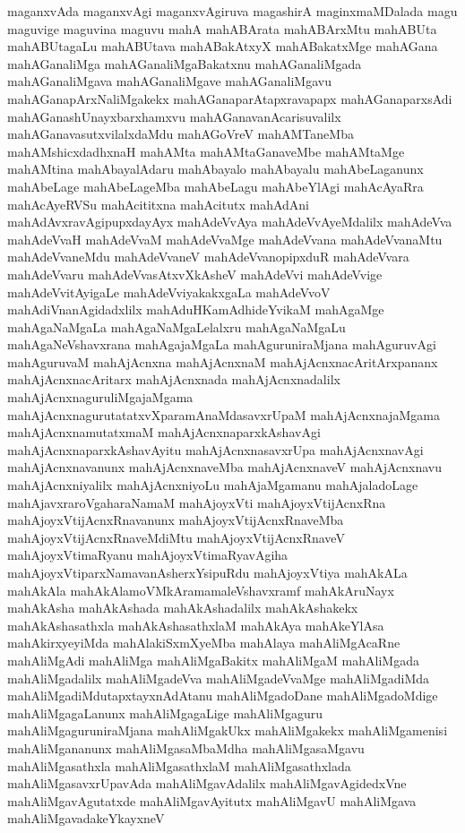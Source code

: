 {maganxvAda
maganxvAgi
maganxvAgiruva
magashirA
maginxmaMDalada
magu
maguvige
maguvina
maguvu
mahA
mahABArata
mahABArxMtu
mahABUta
mahABUtagaLu
mahABUtava
mahABakAtxyX
mahABakatxMge
mahAGana
mahAGanaliMga
mahAGanaliMgaBakatxnu
mahAGanaliMgada
mahAGanaliMgava
mahAGanaliMgave
mahAGanaliMgavu
mahAGanapArxNaliMgakekx
mahAGanaparAtapxravapapx
mahAGanaparxsAdi
mahAGanashUnayxbarxhamxvu
mahAGanavanAcarisuvalilx
mahAGanavasutxvilalxdaMdu
mahAGoVreV
mahAMTaneMba
mahAMshicxdadhxnaH
mahAMta
mahAMtaGanaveMbe
mahAMtaMge
mahAMtina
mahAbayalAdaru
mahAbayalo
mahAbayalu
mahAbeLaganunx
mahAbeLage
mahAbeLageMba
mahAbeLagu
mahAbeYlAgi
mahAcAyaRra
mahAcAyeRVSu
mahAcititxna
mahAcitutx
mahAdAni
mahAdAvxravAgipupxdayAyx
mahAdeVvAya
mahAdeVvAyeMdalilx
mahAdeVva
mahAdeVvaH
mahAdeVvaM
mahAdeVvaMge
mahAdeVvana
mahAdeVvanaMtu
mahAdeVvaneMdu
mahAdeVvaneV
mahAdeVvanopipxduR
mahAdeVvara
mahAdeVvaru
mahAdeVvasAtxvXkAsheV
mahAdeVvi
mahAdeVvige
mahAdeVvitAyigaLe
mahAdeVviyakakxgaLa
mahAdeVvoV
mahAdiVnanAgidadxlilx
mahAduHKamAdhideYvikaM
mahAgaMge
mahAgaNaMgaLa
mahAgaNaMgaLelalxru
mahAgaNaMgaLu
mahAgaNeVshavxrana
mahAgajaMgaLa
mahAguruniraMjana
mahAguruvAgi
mahAguruvaM
mahAjAcnxna
mahAjAcnxnaM
mahAjAcnxnacAritArxpananx
mahAjAcnxnacAritarx
mahAjAcnxnada
mahAjAcnxnadalilx
mahAjAcnxnaguruliMgajaMgama
mahAjAcnxnagurutatatxvXparamAnaMdasavxrUpaM
mahAjAcnxnajaMgama
mahAjAcnxnamutatxmaM
mahAjAcnxnaparxkAshavAgi
mahAjAcnxnaparxkAshavAyitu
mahAjAcnxnasavxrUpa
mahAjAcnxnavAgi
mahAjAcnxnavanunx
mahAjAcnxnaveMba
mahAjAcnxnaveV
mahAjAcnxnavu
mahAjAcnxniyalilx
mahAjAcnxniyoLu
mahAjaMgamanu
mahAjaladoLage
mahAjavxraroVgaharaNamaM
mahAjoyxVti
mahAjoyxVtijAcnxRna
mahAjoyxVtijAcnxRnavanunx
mahAjoyxVtijAcnxRnaveMba
mahAjoyxVtijAcnxRnaveMdiMtu
mahAjoyxVtijAcnxRnaveV
mahAjoyxVtimaRyanu
mahAjoyxVtimaRyavAgiha
mahAjoyxVtiparxNamavanAsherxYsipuRdu
mahAjoyxVtiya
mahAkALa
mahAkAla
mahAkAlamoVMkAramamaleVshavxramf
mahAkAruNayx
mahAkAsha
mahAkAshada
mahAkAshadalilx
mahAkAshakekx
mahAkAshasathxla
mahAkAshasathxlaM
mahAkAya
mahAkeYlAsa
mahAkirxyeyiMda
mahAlakiSxmXyeMba
mahAlaya
mahAliMgAcaRne
mahAliMgAdi
mahAliMga
mahAliMgaBakitx
mahAliMgaM
mahAliMgada
mahAliMgadalilx
mahAliMgadeVva
mahAliMgadeVvaMge
mahAliMgadiMda
mahAliMgadiMdutapxtayxnAdAtanu
mahAliMgadoDane
mahAliMgadoMdige
mahAliMgagaLanunx
mahAliMgagaLige
mahAliMgaguru
mahAliMgaguruniraMjana
mahAliMgakUkx
mahAliMgakekx
mahAliMgamenisi
mahAliMgananunx
mahAliMgasaMbaMdha
mahAliMgasaMgavu
mahAliMgasathxla
mahAliMgasathxlaM
mahAliMgasathxlada
mahAliMgasavxrUpavAda
mahAliMgavAdalilx
mahAliMgavAgidedxVne
mahAliMgavAgutatxde
mahAliMgavAyitutx
mahAliMgavU
mahAliMgava
mahAliMgavadakeYkayxneV
}
